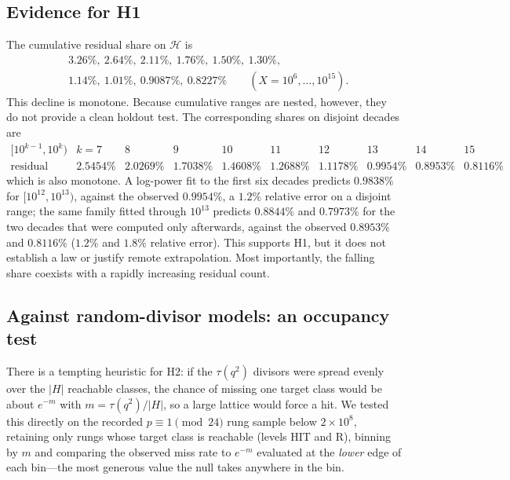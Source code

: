 \documentclass[11pt]{article}
\theoremstyle{definition}
\theoremstyle{remark}
\begin{document}
\subsection{Evidence for H1}\label{sec:h1}

The cumulative residual share on $\mathcal{H}$ is
\begin{equation}\label{eq:hseries}
\begin{aligned}
&3.26\%,\ 2.64\%,\ 2.11\%,\ 1.76\%,\ 1.50\%,\ 1.30\%,\\
&1.14\%,\ 1.01\%,\ 0.9087\%,\ 0.8227\%
\qquad (X = 10^6,\ldots,10^{15}).
\end{aligned}
\end{equation}
This decline is monotone. Because cumulative ranges are nested, however, they do not
provide a clean holdout test. The corresponding shares on disjoint decades are
\begingroup
\small
\setlength{\arraycolsep}{3pt}
\[
\begin{array}{lccccccccc}
[10^{k-1}, 10^k) & k=7 & 8 & 9 & 10 & 11 & 12 & 13 & 14 & 15 \\
\text{residual share} & 2.5454\% & 2.0269\% & 1.7038\% & 1.4608\% & 1.2688\% &
1.1178\% & 0.9954\% & 0.8953\% & 0.8116\%
\end{array}
\]
\endgroup
which is also monotone. A log-power fit to the first six decades predicts $0.9838\%$
for $[10^{12},10^{13})$, against the observed $0.9954\%$, a $1.2\%$ relative error on
a disjoint range; the same family fitted through $10^{13}$ predicts $0.8844\%$ and
$0.7973\%$ for the two decades that were computed only afterwards, against the observed
$0.8953\%$ and $0.8116\%$ ($1.2\%$ and $1.8\%$ relative error). This supports H1,
but it does not establish a law or justify remote extrapolation. Most importantly, the
falling share coexists with a rapidly increasing residual count.

\subsection{Against random-divisor models: an occupancy test}\label{sec:occupancy}

There is a tempting heuristic for H2: if the $\tau(q^2)$ divisors were spread evenly over
the $|H|$ reachable classes, the chance of missing one target class would be about
$e^{-m}$ with $m = \tau(q^2)/|H|$, so a large lattice would force a hit. We tested this
directly on the recorded $p\equiv1\pmod{24}$ rung sample below $2 \times 10^8$, retaining
only rungs whose target class is reachable
(levels HIT and R), binning by $m$ and comparing the observed miss rate to $e^{-m}$
evaluated at the \emph{lower} edge of each bin---the most generous value the null takes
anywhere in the bin.
\end{document}
